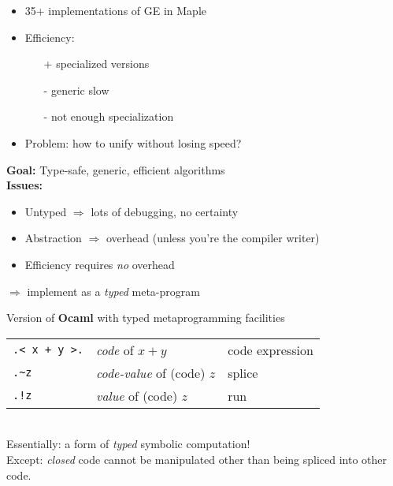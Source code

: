 \documentclass[landscape]{slides}
\begin{document}
\begin{slide}
    \begin{itemize}
        \item 35+ implementations of GE in Maple
        \item Efficiency:
            \begin{itemize}
                \item[+] specialized versions 
                \item[-] generic slow
                \item[-] not enough specialization
            \end{itemize}
        \item Problem: how to unify without losing speed?
    \end{itemize}
\end{slide}

\begin{slide}
    \textbf{Goal:} Type-safe, generic, efficient algorithms\\
    \textbf{Issues:}
    \begin{itemize}
        \item Untyped $\Rightarrow$ lots of debugging, no certainty\vsii
        \item Abstraction $\Rightarrow$ overhead 
            (unless you're the compiler writer)\vsii
        \item Efficiency requires \emph{no} overhead\vsi
    \end{itemize}
    $\Longrightarrow$ implement as a \emph{typed} meta-program
\end{slide}

\begin{slide}
    Version of \textbf{Ocaml} with typed metaprogramming facilities\\
    \begin{tabular}{lll}\hline
        \verb=.< x + y >.= & \emph{code} of $x+y$ & code expression\\
        \verb=.~z= & \emph{code-value} of (code) $z$ & splice \\
        \verb=.!z= & \emph{value} of (code) $z$ & run \\
    \end{tabular}\\
    Essentially: a form of \emph{typed} symbolic computation!\\
    Except: \textit{closed} code cannot be manipulated other than being
    spliced into other code.
\end{slide}
\end{document}
